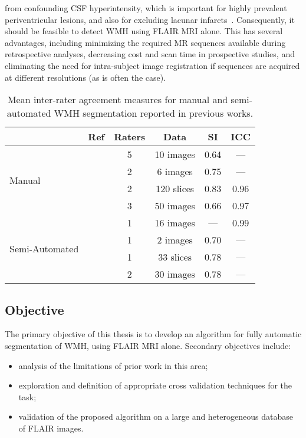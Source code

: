 from confounding CSF hyperintensity, which is important
for highly prevalent periventricular lesions,
and also for excluding lacunar infarcts~\cite{Bakshi2001,Barkhof2002}.
Consequently, it should be feasible to detect WMH using FLAIR MRI alone.
This has several advantages, including
minimizing the required MR sequences available during retrospective analyses,
decreasing cost and scan time in prospective studies,
and eliminating the need for intra-subject image registration if
sequences are acquired at different resolutions (as is often the case).
\par
\begin{table}[h]
  \caption{Mean inter-rater agreement measures
    for manual and semi-automated WMH segmentation reported in previous works.}%
  \label{tab:interrater-cite}
  \centering
  \begin{tabular}{lccccc}
  	\toprule
  	                                &          Ref       & Raters &    Data    &  SI  & ICC  \\ \midrule
  	\multirow{4}{*}{Manual}         &\cite{Harmouche2006}&   5    & 10 images  & 0.64 & ---  \\
  	                                &\cite{DeBoer2009b}  &   2    &  6 images  & 0.75 & ---  \\
  	                                &\cite{Steenwijk2013}&   2    & 120 slices & 0.83 & 0.96 \\
  	                                &\cite{Egger2017}    &   3    & 50 images  & 0.66 & 0.97 \\ \midrule
  	\multirow{4}{*}{Semi-Automated} &\cite{Payne2002}    &   1    & 16 images  & ---  & 0.99 \\
  	                                &\cite{Ghazel2006}   &   1    &  2 images  & 0.70 & ---  \\
  	                                &\cite{Kawata2010}   &   1    & 33 slices  & 0.78 & ---  \\
  	                                &\cite{Iorio2013}    &   2    & 30 images  & 0.78 & ---  \\ \bottomrule
  \end{tabular}
\end{table}
\subsection{Objective}
The primary objective of this thesis is to develop an algorithm
for fully automatic segmentation of WMH, using FLAIR MRI alone.
Secondary objectives include:
\begin{itemize}
  \item analysis of the limitations of prior work in this area;
  \item exploration and definition of appropriate cross validation techniques for the task;
  \item validation of the proposed algorithm on a large and heterogeneous database of FLAIR images.
\end{itemize}
